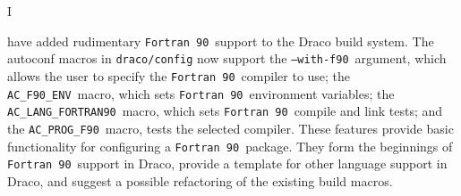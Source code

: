 \documentclass[11pt]{nmemo}
\newcommand{\fninety}{\texttt{Fortran~90}}
\newcommand{\withfninety}{\texttt{--with-f90}}
\newcommand{\fninetyenv}{\texttt{AC\_F90\_ENV}}
\newcommand{\langfninety}{\texttt{AC\_LANG\_FORTRAN90}}
\newcommand{\progfninety}{\texttt{AC\_PROG\_F90}}
\begin{document}

\subject{\fninety\ Build Support in Draco}
\date{\today}




\opening


I have added rudimentary \fninety\ support to the Draco build
system\cite{draco-build}.  The autoconf\cite{autoconf} macros in
\texttt{draco/config} 	now support the \withfninety\ argument, which
allows the user to specify the \fninety\ compiler to use; the
\fninetyenv\ macro, which sets \fninety\ environment variables; the
\langfninety\ macro, which sets \fninety\ compile and link tests; and
the \progfninety\ macro, tests the selected compiler.  These features
provide basic functionality for configuring a \fninety\ package.  They
form the beginnings of \fninety\ support in Draco, provide a template
for other language support in Draco, and suggest a possible
refactoring of the existing build macros.
\end{document}

